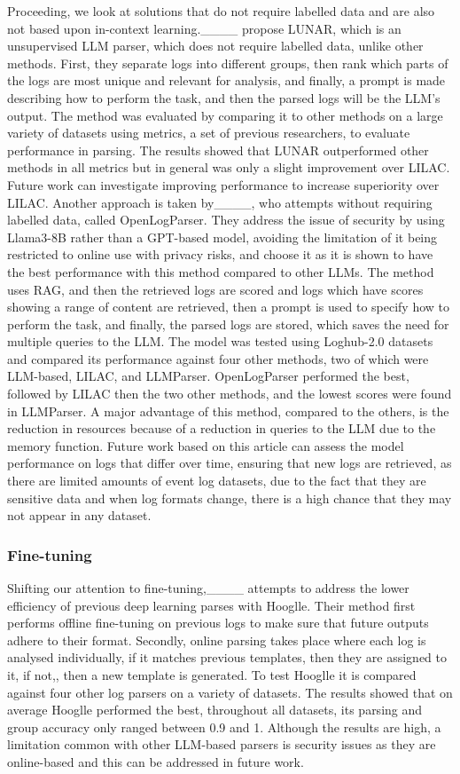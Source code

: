 Proceeding, we look at solutions that do not require labelled data and are also not based upon in-context learning.____ propose LUNAR, which is an unsupervised LLM parser, which does not require labelled data, unlike other methods. First, they separate logs into different groups, then rank which parts of the logs are most unique and relevant for analysis, and finally, a prompt is made describing how to perform the task, and then the parsed logs will be the LLM's output. The method was evaluated by comparing it to other methods on a large variety of datasets using metrics, a set of previous researchers, to evaluate performance in parsing. The results showed that LUNAR outperformed other methods in all metrics but in general was only a slight improvement over LILAC. Future work can investigate improving performance to increase superiority over LILAC. Another approach is taken by____, who attempts without requiring labelled data, called OpenLogParser. They address the issue of security by using Llama3-8B rather than a GPT-based model, avoiding the limitation of it being restricted to online use with privacy risks, and choose it as it is shown to have the best performance with this method compared to other LLMs. The method uses RAG, and then the retrieved logs are scored and logs which have scores showing a range of content are retrieved, then a prompt is used to specify how to perform the task, and finally, the parsed logs are stored, which saves the need for multiple queries to the LLM. The model was tested using Loghub-2.0 datasets and compared its performance against four other methods, two of which were LLM-based, LILAC, and LLMParser. OpenLogParser performed the best, followed by LILAC then the two other methods, and the lowest scores were found in LLMParser. A major advantage of this method, compared to the others, is the reduction in resources because of a reduction in queries to the LLM due to the memory function. Future work based on this article can assess the model performance on logs that differ over time, ensuring that new logs are retrieved, as there are limited amounts of event log datasets, due to the fact that they are sensitive data and when log formats change, there is a high chance that they may not appear in any dataset.

\subsubsection{Fine-tuning}
Shifting our attention to fine-tuning,____ attempts to address the lower efficiency of previous deep learning parses with Hooglle. Their method first performs offline fine-tuning on previous logs to make sure that future outputs adhere to their format. Secondly, online parsing takes place where each log is analysed individually, if it matches previous templates, then they are assigned to it, if not,, then a new template is generated. To test Hooglle it is compared against four other log parsers on a variety of datasets. The results showed that on average Hooglle performed the best, throughout all datasets, its parsing and group accuracy only ranged between 0.9 and 1. Although the results are high, a limitation common with other LLM-based parsers is security issues as they are online-based and this can be addressed in future work.

